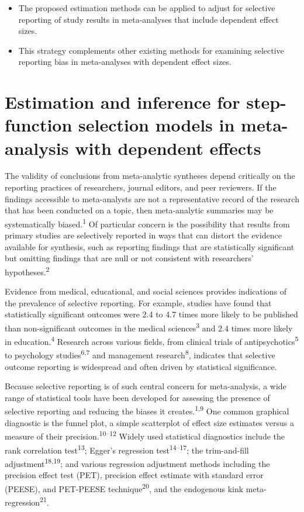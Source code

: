 \documentclass[
  man, donotrepeattitle,floatsintext]{apa7}
\begin{document}
\begin{itemize}
\item
  The proposed estimation methods can be applied to adjust for selective reporting of study results in meta-analyses that include dependent effect sizes.
\item
  This strategy complements other existing methods for examining selective reporting bias in meta-analyses with dependent effect sizes.
\end{itemize}

\newpage

\section{Estimation and inference for step-function selection models in meta-analysis with dependent effects}\label{introduction}

The validity of conclusions from meta-analytic syntheses depend critically on the reporting practices of researchers, journal editors, and peer reviewers.
If the findings accessible to meta-analysts are not a representative record of the research that has been conducted on a topic, then meta-analytic summaries may be systematically biased.\textsuperscript{1}
Of particular concern is the possibility that results from primary studies are selectively reported in ways that can distort the evidence available for synthesis, such as reporting findings that are statistically significant but omitting findings that are null or not consistent with researchers' hypotheses.\textsuperscript{2}

Evidence from medical, educational, and social sciences provides indications of the prevalence of selective reporting. For example, studies have found that statistically significant outcomes were 2.4 to 4.7 times more likely to be published than non-significant outcomes in the medical sciences\textsuperscript{3} and 2.4 times more likely in education.\textsuperscript{4} Research across various fields, from clinical trials of antipsychotics\textsuperscript{5} to psychology studies\textsuperscript{6,7} and management research\textsuperscript{8}, indicates that selective outcome reporting is widespread and often driven by statistical significance.

Because selective reporting is of such central concern for meta-analysis, a wide range of statistical tools have been developed for assessing the presence of selective reporting and reducing the biases it creates.\textsuperscript{1,9}
One common graphical diagnostic is the funnel plot, a simple scatterplot of effect size estimates versus a measure of their precision.\textsuperscript{10--12} Widely used statistical diagnostics include the rank correlation test\textsuperscript{13}; Egger's regression test\textsuperscript{14--17}; the trim-and-fill adjustment\textsuperscript{18,19}; and various regression adjustment methods including the precision effect test (PET), precision effect estimate with standard error (PEESE), and PET-PEESE technique\textsuperscript{20}, and the endogenous kink meta-regression\textsuperscript{21}.
\end{document}

